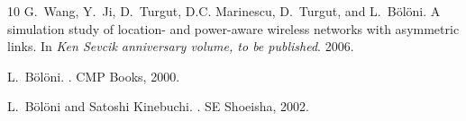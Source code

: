 \begin{thebibliography}{10}
G.~Wang, Y.~Ji, D.~Turgut, D.C. Marinescu, D.~Turgut, and L.~B{\"o}l{\"o}ni.
\newblock A simulation study of location- and power-aware wireless networks
  with asymmetric links.
\newblock In {\em Ken Sevcik anniversary volume, to be published}. 2006.

L.~B{\"o}l{\"o}ni.
.
\newblock CMP Books, 2000.

L.~B{\"o}l{\"o}ni and Satoshi Kinebuchi.
.
\newblock SE Shoeisha, 2002.

\end{thebibliography}
